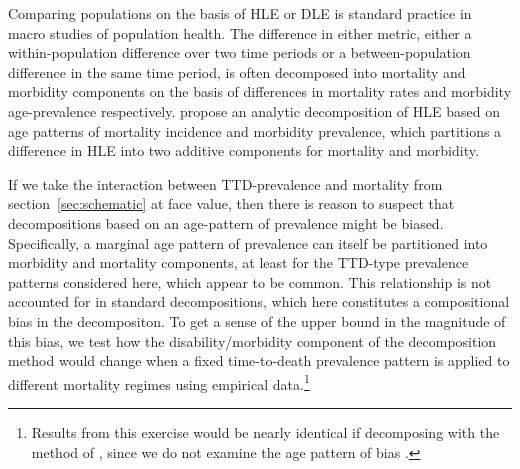 \documentclass[12pt,oneside,a4paper]{article} %
\begin{document}
Comparing populations on the basis of HLE or DLE is standard practice in macro studies of population
health. The difference in either metric, either a within-population difference
over two time periods or a between-population difference in the same time
period, is often decomposed into mortality and morbidity components on the basis
of differences in mortality rates and morbidity age-prevalence respectively.
\citet{Andreev2002} propose an analytic decomposition of HLE based on age patterns of mortality
incidence and morbidity prevalence, which partitions a difference in HLE into
two additive components for mortality and morbidity.


If we take the interaction between TTD-prevalence and mortality from
section~\ref{sec:schematic} at face value, then there is reason to suspect that
decompositions based on an age-pattern of prevalence might be biased.
Specifically, a marginal age pattern of prevalence can itself be partitioned
into morbidity and mortality components, at least for the TTD-type prevalence
patterns considered here, which appear to be common.
This relationship is not accounted for in standard decompositions, which here constitutes a compositional bias in the decompositon.
To get a sense of the upper bound in the magnitude of this bias, we test how the disability/morbidity
component of the \citet{Andreev2002} decomposition method would change when a fixed time-to-death
prevalence pattern is applied to different mortality regimes using empirical data.\footnote{Results from this exercise would be nearly identical if decomposing with the method of \citet{Nusselder2004}, since we do not examine the age pattern of bias \citep{shkolnikov2017}.} %
\end{document}
